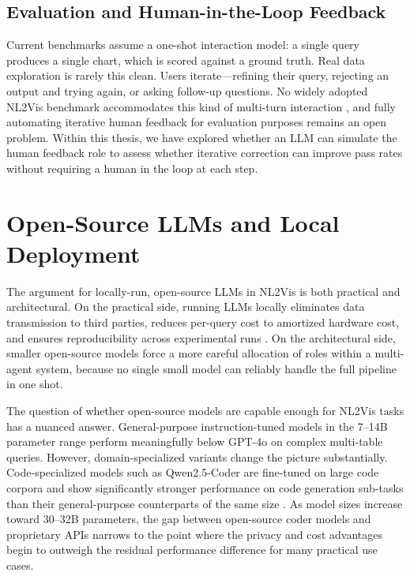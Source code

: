 \documentclass[a4paper,oneside,bibliography=totoc]{scrbook}
\begin{document}
\subsection{Evaluation and Human-in-the-Loop Feedback}

Current benchmarks assume a one-shot interaction model: a single query produces a single chart, which is scored against a ground truth. Real data exploration is rarely this clean. Users iterate---refining their query, rejecting an output and trying again, or asking follow-up questions. No widely adopted NL2Vis benchmark accommodates this kind of multi-turn interaction \cite{chen2025viseval}, and fully automating iterative human feedback for evaluation purposes remains an open problem. Within this thesis, we have explored whether an LLM can simulate the human feedback role to assess whether iterative correction can improve pass rates without requiring a human in the loop at each step.

\section{Open-Source LLMs and Local Deployment}
\label{sec:local_llms}

The argument for locally-run, open-source LLMs in NL2Vis is both practical and architectural. On the practical side, running LLMs locally eliminates data transmission to third parties, reduces per-query cost to amortized hardware cost, and ensures reproducibility across experimental runs \cite{lin2024awq}. On the architectural side, smaller open-source models force a more careful allocation of roles within a multi-agent system, because no single small model can reliably handle the full pipeline in one shot.

The question of whether open-source models are capable enough for NL2Vis tasks has a nuanced answer. General-purpose instruction-tuned models in the 7--14B parameter range perform meaningfully below GPT-4o on complex multi-table queries. However, domain-specialized variants change the picture substantially. Code-specialized models such as Qwen2.5-Coder are fine-tuned on large code corpora and show significantly stronger performance on code generation sub-tasks than their general-purpose counterparts of the same size \cite{wu2024automated}. As model sizes increase toward 30--32B parameters, the gap between open-source coder models and proprietary APIs narrows to the point where the privacy and cost advantages begin to outweigh the residual performance difference for many practical use cases.
\end{document}
